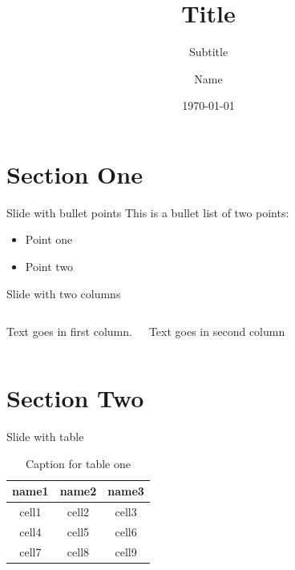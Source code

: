 \documentclass{beamer}
\title{Title}
\subtitle{Subtitle}
\date{\today}
\author{Name}
\institute{Department of Psychology, the Chinese University of Hong Kong}
\begin{document}
    \hspace{-40pt}\maketitle
    \tableofcontents

    \section{Section One}
    \begin{frame}{Slide with bullet points}
        This is a bullet list of two points:
        \begin{itemize}
            \item Point one
            \item Point two
        \end{itemize}
    \end{frame}

    \begin{frame}{Slide with two columns}
        \begin{columns}
            Text goes in first column.
            
            Text goes in second column
        \end{columns}
    \end{frame}

    \section{Section Two}

    \begin{frame}{Slide with table}
        \begin{table}
            \hspace{-50pt}\centering
            \begin{tabular}{ccc}
                \hline
                \textbf{name1} & \textbf{name2} & \textbf{name3} \\
                \hline 
                cell1 & cell2 & cell3 \\ 
                cell4 & cell5 & cell6 \\ 
                cell7 & cell8 & cell9 \\ 
                \hline
            \end{tabular}
            \caption{Caption for table one}
            \label{tab:table1}
        \end{table}
    \end{frame}
\end{document}

